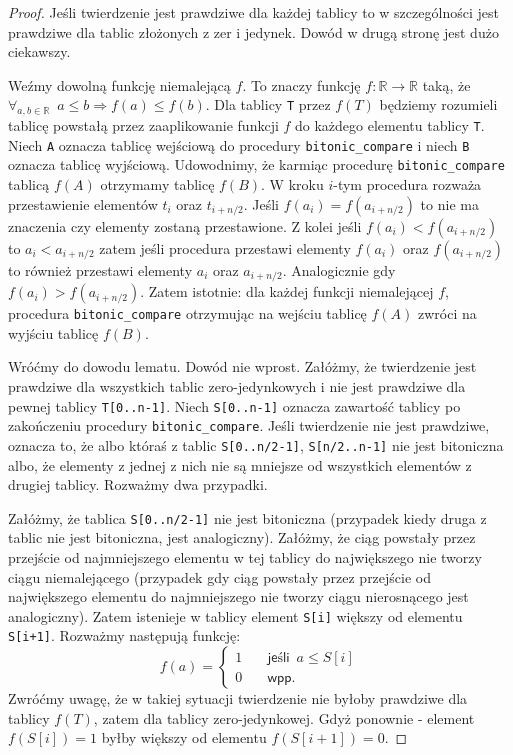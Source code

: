 \begin{proof}
 Jeśli twierdzenie jest prawdziwe dla każdej tablicy to w szczególności jest prawdziwe dla tablic złożonych z zer i jedynek.
 Dowód w drugą stronę jest dużo ciekawszy.
 
 Weźmy dowolną funkcję niemalejącą $f$.
 To znaczy funkcję $f: \mathbb{R} \rightarrow \mathbb{R}$ taką, że $\forall_{a, b \in \mathbb{R}} \enspace a \leq b \Rightarrow f(a) \leq f(b)$.
 Dla tablicy \texttt{T} przez $f(T)$ będziemy rozumieli tablicę powstałą przez zaaplikowanie funkcji $f$ do każdego elementu tablicy \texttt{T}.
 Niech \texttt{A} oznacza tablicę wejściową do procedury \texttt{bitonic\_compare} i niech \texttt{B} oznacza tablicę wyjściową.
 Udowodnimy, że karmiąc procedurę \texttt{bitonic\_compare} tablicą $f(A)$ otrzymamy tablicę $f(B)$.
 W kroku $i$-tym procedura rozważa przestawienie elementów $t_i$ oraz $t_{i+n/2}$.
 Jeśli $f(a_i) = f(a_{i+n/2})$ to nie ma znaczenia czy elementy zostaną przestawione.
 Z kolei jeśli $f(a_i) < f(a_{i+n/2})$ to $a_i < a_{i+n/2}$ zatem jeśli procedura przestawi elementy $f(a_i)$ oraz $f(a_{i+n/2})$ to również przestawi elementy $a_i$ oraz $a_{i+n/2}$.
 Analogicznie gdy $f(a_i) > f(a_{i+n/2})$.
 Zatem istotnie: dla każdej funkcji niemalejącej $f$, procedura \texttt{bitonic\_compare} otrzymując na wejściu tablicę $f(A)$ zwróci na wyjściu tablicę $f(B)$.
 
 Wróćmy do dowodu lematu.
 Dowód nie wprost.
 Załóżmy, że twierdzenie jest prawdziwe dla wszystkich tablic zero-jedynkowych i nie jest prawdziwe dla pewnej tablicy \texttt{T[0..n-1]}.
 Niech \texttt{S[0..n-1]} oznacza zawartość tablicy po zakończeniu procedury \texttt{bitonic\_compare}.
 Jeśli twierdzenie nie jest prawdziwe, oznacza to, że albo któraś z tablic \texttt{S[0..n/2-1]}, \texttt{S[n/2..n-1]} nie jest bitoniczna albo, że elementy z jednej z nich nie są mniejsze od wszystkich elementów z drugiej tablicy.
 Rozważmy dwa przypadki.
 
 Załóżmy, że tablica \texttt{S[0..n/2-1]} nie jest bitoniczna (przypadek kiedy druga z tablic nie jest bitoniczna, jest analogiczny).
 Załóżmy, że ciąg powstały przez przejście od najmniejszego elementu w tej tablicy do największego nie tworzy ciągu niemalejącego (przypadek gdy ciąg powstały przez przejście od największego elementu do najmniejszego nie tworzy ciągu nierosnącego jest analogiczny).
 Zatem istenieje w tablicy element \texttt{S[i]} większy od elementu \texttt{S[i+1]}.
 Rozważmy następują funkcję:
 \[   
  f(a) = 
     \begin{cases}
       1 &\quad\textsf{jeśli} \enspace a \leq S[i]\\
       0 &\quad\textsf{wpp.}
     \end{cases}
 \]
 Zwróćmy uwagę, że w takiej sytuacji twierdzenie nie byłoby prawdziwe dla tablicy $f(T)$, zatem dla tablicy zero-jedynkowej.
 Gdyż ponownie - element $f(S[i]) = 1$ byłby większy od elementu $f(S[i+1]) = 0$.
 

\end{proof}
